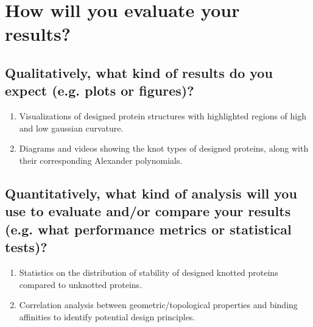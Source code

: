 \documentclass{article}
\begin{document}
\section{How will you evaluate your results?}
\subsection{
Qualitatively, what kind of results do you expect (e.g. plots or
figures)?}
\begin{enumerate}
    \item Visualizations of designed protein structures with highlighted regions of high and low gaussian curvature.
    \item Diagrams and videos showing the knot types of designed proteins, along with their corresponding Alexander polynomials.
\end{enumerate}

\subsection{Quantitatively, what kind of analysis will you use to evaluate
and/or compare your results (e.g. what performance metrics or
statistical tests)?}
\begin{enumerate}
    \item Statistics on the distribution of stability of designed knotted proteins compared to unknotted proteins. 
    \item Correlation analysis between geometric/topological properties and binding affinities to identify potential design principles.
\end{enumerate}



\end{document}
